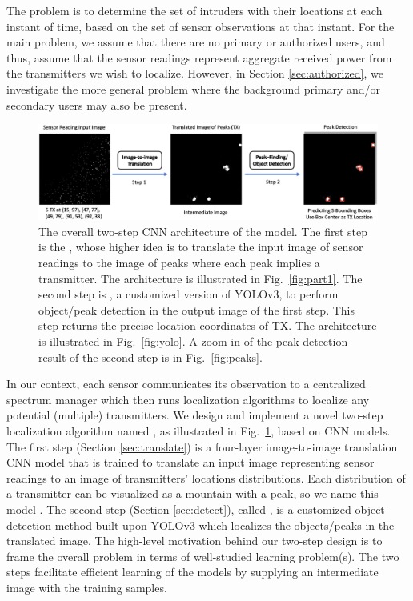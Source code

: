 The \mtl problem is to determine the set of intruders with their
locations at each instant of time, based on the set of sensor
observations at that instant. 
For the main 
\mtl problem, we assume that there are no primary or authorized users, and thus, assume that the
sensor readings represent aggregate received power from the transmitters we
wish to localize.
However, in Section \ref{sec:authorized}, we investigate the more general \mtl problem where the background primary and/or secondary users may also be present.

\begin{figure}
    \centering
    \includegraphics[width=\textwidth]{chapters/wowmom-pmc/figures/two-step-idea.png}
    \caption{The overall two-step CNN architecture of the \our model. The first step is the \imgimg, 
    whose higher idea is to translate the input image of sensor readings to the image of peaks where each peak implies a transmitter. 
    The \imgimg architecture is illustrated in Fig.~\ref{fig:part1}. The second step is \yolocust, a customized version of YOLOv3, 
    to perform object/peak detection in the output image of the first step. This step returns the precise location coordinates of TX. 
    The \yolocust architecture is illustrated in Fig.~\ref{fig:yolo}. A zoom-in of the peak detection result of the second step is in Fig.~\ref{fig:peaks}.}
    \label{fig:overall}
\end{figure}

In our context, each sensor communicates its observation to a centralized spectrum 
manager which then runs localization algorithms to localize any potential (multiple) transmitters. 
We design and implement a novel two-step localization algorithm named \our, as illustrated in Fig.~\ref{fig:overall}, based on CNN models. 
The first step (Section \ref{sec:translate}) is a four-layer image-to-image translation CNN model that is trained
to translate an input image representing sensor readings to an image of 
transmitters' locations distributions. Each distribution of a transmitter can be visualized as a mountain with a peak, so we name this model \imgimg.
The second step (Section \ref{sec:detect}), called \yolocust, is a customized object-detection method built upon YOLOv3\cite{yolov3} which localizes the objects/peaks in the translated image.
The high-level motivation behind our two-step design is to frame the overall \mtl
problem in terms of well-studied learning problem(s). 
The two steps facilitate efficient learning of the models by supplying an intermediate image with the training samples. 
